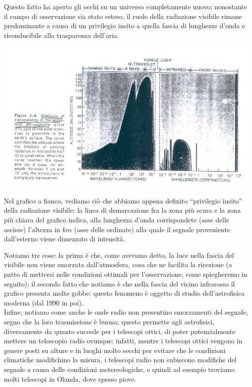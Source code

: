 Questo fatto ha aperto gli occhi su un universo completamente nuovo; nonostante il campo di osservazione sia stato esteso, il ruolo della radiazione visibile rimane predominante a causa di un privilegio insito a quella fascia di lunghezze d'onda e riconducibile alla trasparenza dell'aria.
\\
\begin{minipage}{.50\textwidth}
	\centering
	\includegraphics[width=1\textwidth]{Img/bertin_2.png}
\end{minipage}
\begin{minipage}{.50\textwidth}
	Nel grafico a fianco, vediamo ciò che abbiamo appena definito ``privilegio insito'' della radiazione visibile; la linea di demarcazione fra la zona più scura e la zona più chiara del grafico indica, alla lunghezza d'onda corrispondete (asse delle ascisse) l'altezza in $km$ (asse delle ordinate) alla quale il segnale proveniente dall'esterno viene dimezzato di intensità.
\end{minipage}
\vspace{0.3cm}
Notiamo tre cose: la prima è che, come avevamo detto, la luce nella fascia del visibile non viene smorzata dall'atmosfera, cosa che ne facilita la ricezione (a patto di mettersi nelle condizioni ottimali per l'osservazione, come spiegheremo in seguito); il secondo fatto che notiamo è che nella fascia del vicino infrarosso il grafico presenta molte gobbe: questo  fenomeno è oggetto di studio dell'astrofisica moderna (dal 1990 in poi).\\
Infine, notiamo come anche le onde radio non presentino smorzamenti del segnale, segno che la loro trasmissione è buona; questo permette agli astrofisici, diversamente da quanto succede per i telescopi ottici, di poter potenzialmente mettere un telescopio radio ovunque: infatti, mentre i telescopi ottici vengono in genere posti su alture e in luoghi molto secchi per evitare che le condizioni climatiche modifichino la misura, i telescopi radio non subiscono modifiche del segnale a causa delle condizioni metereologiche, e quindi ad esempio troviamo molti telescopi in Olanda, dove spesso piove.

